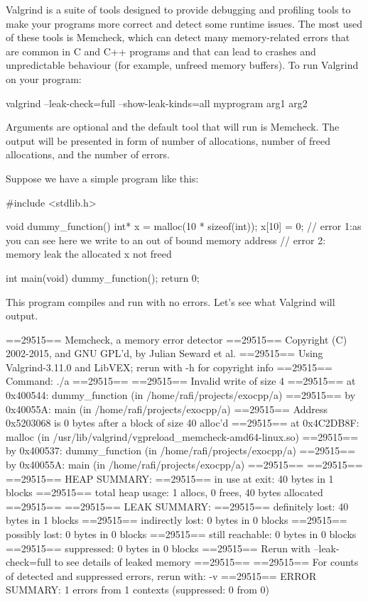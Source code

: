Valgrind is a suite of tools designed to provide debugging and profiling tools to make your programs more correct and detect some runtime issues. The most used of these tools is Memcheck, which can detect many memory-related errors that are common in C and C++ programs and that can lead to crashes and unpredictable behaviour (for example, unfreed memory buffers). To run Valgrind on your program:

\begin{code}[language=C]
valgrind --leak-check=full --show-leak-kinds=all myprogram arg1 arg2
\end{code}

Arguments are optional and the default tool that will run is Memcheck. The output will be presented in form of number of allocations, number of freed allocations, and the number of errors.

Suppose we have a simple program like this:

\begin{code}[language=C]
#include <stdlib.h>

void dummy_function() {
	int* x = malloc(10 * sizeof(int));
	x[10] = 0;        // error 1:as you can see here we write to an out of bound memory address
}                    // error 2: memory leak the allocated x not freed

int main(void) {
	dummy_function();
	return 0;
}
\end{code}

This program compiles and run with no errors. Let's see what Valgrind will output.

\begin{code}[language=C]
==29515== Memcheck, a memory error detector
==29515== Copyright (C) 2002-2015, and GNU GPL'd, by Julian Seward et al.
==29515== Using Valgrind-3.11.0 and LibVEX; rerun with -h for copyright info
==29515== Command: ./a
==29515== 
==29515== Invalid write of size 4
==29515==    at 0x400544: dummy_function (in /home/rafi/projects/exocpp/a)
==29515==    by 0x40055A: main (in /home/rafi/projects/exocpp/a)
==29515==  Address 0x5203068 is 0 bytes after a block of size 40 alloc'd
==29515==    at 0x4C2DB8F: malloc (in /usr/lib/valgrind/vgpreload_memcheck-amd64-linux.so)
==29515==    by 0x400537: dummy_function (in /home/rafi/projects/exocpp/a)
==29515==    by 0x40055A: main (in /home/rafi/projects/exocpp/a)
==29515== 
==29515== 
==29515== HEAP SUMMARY:
==29515==     in use at exit: 40 bytes in 1 blocks
==29515==   total heap usage: 1 allocs, 0 frees, 40 bytes allocated
==29515== 
==29515== LEAK SUMMARY:
==29515==    definitely lost: 40 bytes in 1 blocks
==29515==    indirectly lost: 0 bytes in 0 blocks
==29515==      possibly lost: 0 bytes in 0 blocks
==29515==    still reachable: 0 bytes in 0 blocks
==29515==         suppressed: 0 bytes in 0 blocks
==29515== Rerun with --leak-check=full to see details of leaked memory
==29515== 
==29515== For counts of detected and suppressed errors, rerun with: -v
==29515== ERROR SUMMARY: 1 errors from 1 contexts (suppressed: 0 from 0)
\end{code}

